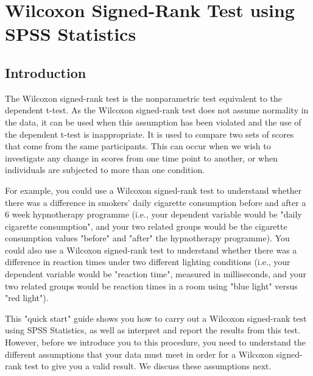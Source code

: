 \documentclass[]{article}
\begin{document}
\section{Wilcoxon Signed-Rank Test using SPSS Statistics}

\subsection{Introduction}
The Wilcoxon signed-rank test is the nonparametric test equivalent to the dependent t-test. As the Wilcoxon signed-rank test does not assume normality in the data, it can be used when this assumption has been violated and the use of the dependent t-test is inappropriate. It is used to compare two sets of scores that come from the same participants. This can occur when we wish to investigate any change in scores from one time point to another, or when individuals are subjected to more than one condition.

For example, you could use a Wilcoxon signed-rank test to understand whether there was a difference in smokers' daily cigarette consumption before and after a 6 week hypnotherapy programme (i.e., your dependent variable would be "daily cigarette consumption", and your two related groups would be the cigarette consumption values "before" and "after" the hypnotherapy programme). You could also use a Wilcoxon signed-rank test to understand whether there was a difference in reaction times under two different lighting conditions (i.e., your dependent variable would be "reaction time", measured in milliseconds, and your two related groups would be reaction times in a room using "blue light" versus "red light").

This "quick start" guide shows you how to carry out a Wilcoxon signed-rank test using SPSS Statistics, as well as interpret and report the results from this test. However, before we introduce you to this procedure, you need to understand the different assumptions that your data must meet in order for a Wilcoxon signed-rank test to give you a valid result. We discuss these assumptions next.
\end{document}
